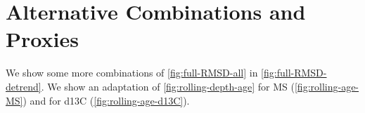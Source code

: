 \documentclass[draft]{agujournal2019}
\begin{document}
%
%



%
%
%
%
\appendix


\section{Alternative Combinations and Proxies}

We show some more combinations of \cref{fig:full-RMSD-all} in \cref{fig:full-RMSD-detrend}.
We show an adaptation of \cref{fig:rolling-depth-age} for \gls{MS} (\cref{fig:rolling-age-MS}) and for \gls{d13C} (\cref{fig:rolling-age-d13C}).
\end{document}
